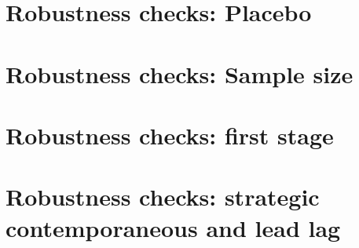 \documentclass{beamer}
\begin{document}
\section{Robustness checks: Placebo}

\begin{frame}{}

\end{frame}

\begin{frame}{}

\end{frame}

\section{Robustness checks: Sample size}

\begin{frame}{}

\end{frame}

\begin{frame}{}

\end{frame}

\begin{frame}{}

\end{frame}

\section{Robustness checks: first stage}

\begin{frame}{}

\end{frame}

\begin{frame}{}

\end{frame}

\section{Robustness checks: strategic contemporaneous and lead lag}

\begin{frame}

\end{frame}

\begin{frame}

\end{frame}
\end{document}

